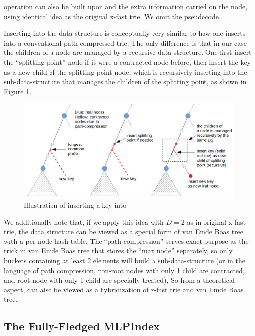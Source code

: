 \documentclass[11pt, usletter]{article}
\begin{document}
\lowerbound operation can also be built upon \QueryLCP and the extra information 
carried on the node, using identical idea as the original x-fast trie. We omit the pseudocode.

Inserting into the data structure is conceptually very similar to how one inserts into a conventional 
path-compressed trie.
The only difference is that in our case the children of a node are managed by a recursive data structure. 
One first insert the ``splitting point'' node if it were a contracted node before,  
then insert the key as a new child of the splitting point node, 
which is recursively inserting into the sub-data-structure that manages the children of the splitting point, 
as shown in Figure \ref{mlpindex_insert}.

\begin{figure}[!htb]
  \includegraphics[width=\linewidth]{mlpindex_insert.png}
\caption{Illustration of inserting a key into \MlpIndex}
\label{mlpindex_insert}
\end{figure}

We additionally note that, if we apply this idea with $D=2$ as in original x-fast trie, 
the data structure can be viewed as a special form of van Emde Boas tree \cite{vebtree} with a per-node hash table.
The ``path-compression'' serves exact purpose as the trick in van Emde Boas tree that stores the ``max node'' separately, 
so only buckets containing at least 2 elements will build a sub-data-structure 
(or in the language of path compression, non-root nodes with only 1 child are contracted, 
and root node with only 1 child are specially treated), 
So from a theoretical aspect, \MlpIndex can also be viewed as a hybridization of x-fast trie and van Emde Boas tree.

\subsection{The Fully-Fledged MLPIndex} \label{mlpindex}
\end{document}
